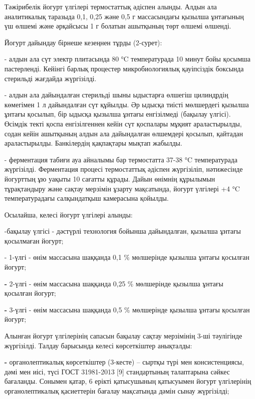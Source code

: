 \begin{multicols}{2}
Тәжірибелік йогурт үлгілері термостаттық әдіспен алынды. Алдын ала
аналитикалық таразыда 0,1, 0,25 және 0,5 г массасындағы қызылша
ұнтағының үш өлшемі және әрқайсысы 1 г болатын ашытқының төрт өлшемі
өлшенді.

Йогурт дайындау бірнеше кезеңнен тұрды (2-сурет):

- алдын ала сүт электр плитасында 80 °C температурада 10 минут бойы
қосымша пастерленді. Кейінгі барлық процестер микробиологиялық
қауіпсіздік боксында стерильді жағдайда жүргізілді.

- алдын ала дайындалған стерильді шыны ыдыстарға өлшегіш цилиндрдің
көмегімен 1 л дайындалған сүт құйылды. Әр ыдысқа тиісті мөлшердегі
қызылша ұнтағы қосылып, бір ыдысқа қызылша ұнтағы енгізілмеді (бақылау
үлгісі). Өсімдік текті қоспа енгізілгеннен кейін сүт қоспалары мұқият
араластырылды, содан кейін ашытқының алдын ала дайындалған өлшемдері
қосылып, қайтадан араластырылды. Банкілердің қақпақтары мықтап жабылды.

- ферментация табиғи ауа айналымы бар термостатта 37-38 °C температурада
жүргізілді. Ферментация процесі термостаттық әдіспен жүргізіліп,
нәтижесінде йогурттың ұю уақыты 10 сағатты құрады. Дайын өнімнің
құрылымын тұрақтандыру және сақтау мерзімін ұзарту мақсатында, йогурт
үлгілері +4 °C температурадағы салқындатқыш камерасына қойылды.

Осылайша, келесі йогурт үлгілері алынды:

-бақылау үлгісі - дәстүрлі технология бойынша дайындалған, қызылша
ұнтағы қосылмаған йогурт;

- 1-үлгі - өнім массасына шаққанда 0,1 \% мөлшерінде қызылша ұнтағы
қосылған йогурт;

{\bfseries -} 2-үлгі - өнім массасына шаққанда 0,25 \% мөлшерінде қызылша
ұнтағы қосылған йогурт;

{\bfseries -} 3-үлгі - өнім массасына шаққанда 0,5 \% мөлшерінде қызылша
ұнтағы қосылған йогурт;

Алынған йогурт үлгілерінің сапасын бақылау сақтау мерзімінің 3-ші
тәулігінде жүргізілді. Талдау барысында келесі көрсеткіштер анықталды:

{\bfseries -} органолептикалық көрсеткіштер (3-кесте) -- сыртқы түрі мен
консистенциясы, дәмі мен иісі, түсі ГОСТ 31981-2013 {[}9{]} стандартының
талаптарына сәйкес бағаланды. Сонымен қатар, 6 ерікті қатысушының
қатысуымен йогурт үлгілерінің органолептикалық қасиеттерін бағалау
мақсатында дәмін сынау жүргізілді;


\end{multicols}
